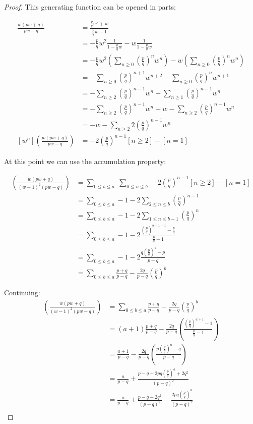\documentclass[10pt]{book}
\begin{document}
\begin{proof}
This generating function can be opened in parts:

\begin{align*}
  \frac{w(pw+q)}{pw-q}
    &= \frac{\frac{p}{q}w^2+w}{\frac{p}{q}w-1} \\
    &= -\frac{p}{q}w^2\frac{1}{1-\frac{p}{q}w}-w\frac{1}{1-\frac{p}{q}w} \\
    &= -\frac{p}{q}w^2\left(\sum_{n\ge 0}\left(\frac{p}{q}\right)^nw^n\right)
       -w\left(\sum_{n\ge 0}\left(\frac{p}{q}\right)^nw^n\right)\\
    &= -\sum_{n\ge 0}\left(\frac{p}{q}\right)^{n+1}w^{n+2}
       -\sum_{n\ge 0}\left(\frac{p}{q}\right)^nw^{n+1} \\
    &= -\sum_{n\ge 2}\left(\frac{p}{q}\right)^{n-1}w^{n}
       -\sum_{n\ge 1}\left(\frac{p}{q}\right)^{n-1}w^{n} \\
    &= -\sum_{n\ge 2}\left(\frac{p}{q}\right)^{n-1}w^{n}
       -w -\sum_{n\ge 2}\left(\frac{p}{q}\right)^{n-1}w^{n} \\
    &= -w -\sum_{n\ge 2}2\left(\frac{p}{q}\right)^{n-1}w^{n} \\
  [w^n]\left(\frac{w(pw+q)}{pw-q}\right) 
  &= -2\left(\frac{p}{q}\right)^{n-1}[n\ge 2]-[n=1]
\end{align*}

At this point we can use the accumulation property:

\begin{align*}
  [w^a]\left(\frac{w(pw+q)}{(w-1)^2(pw-q)}\right) 
  &= \sum_{0\le b\le a}\;\sum_{0\le n\le b}
     -2\left(\frac{p}{q}\right)^{n-1}[n\ge 2]-[n=1]\\
  &= \sum_{0\le b\le a}-1-2\sum_{2\le n\le b}
     \left(\frac{p}{q}\right)^{n-1}\\
  &= \sum_{0\le b\le a}-1-2\sum_{1\le n\le b-1}
     \left(\frac{p}{q}\right)^{n}\\
  &= \sum_{0\le b\le a}-1
     -2\frac{\left(\frac{p}{q}\right)^{b-1+1}-\frac{p}{q}}{\frac{p}{q}-1}\\
  &= \sum_{0\le b\le a}-1
     -2\frac{q\left(\frac{p}{q}\right)^b-p}{p-q}\\
     &= \sum_{0\le b\le a}\frac{p+q}{p-q}
     -\frac{2q}{p-q}\left(\frac{p}{q}\right)^b
\end{align*}

Continuing:
\begin{align*}
  [w^a]\left(\frac{w(pw+q)}{(w-1)^2(pw-q)}\right) 
     &= \sum_{0\le b\le a}\frac{p+q}{p-q}
     -\frac{2q}{p-q}\left(\frac{p}{q}\right)^b\\
     &= (a+1)\frac{p+q}{p-q}-\frac{2q}{p-q}
     \left(\frac{\left(\frac{p}{q}\right)^{a+1}-1}{\frac{p}{q}-1}\right)\\
     &= \frac{a+1}{p-q}-\frac{2q}{p-q}
     \left(\frac{p\left(\frac{p}{q}\right)^{a}-q}{p-q}\right)\\
     &= \frac{a}{p-q}+\frac{p-q+2pq\left(\frac{p}{q}\right)^a+2q^2}{(p-q)^2}\\
     &= \frac{a}{p-q}+\frac{p-q+2q^2}{(p-q)^2}
     -\frac{2pq\left(\frac{p}{q}\right)^a}{(p-q)^2}\\
\end{align*}


\end{proof}
\end{document}
